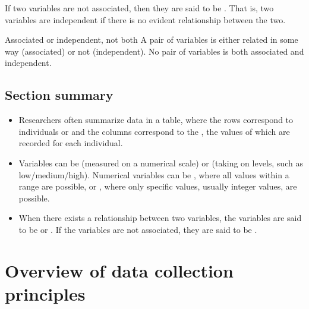 If two variables are not associated,
then they are said to be .
That is, two variables are independent if there
is no evident relationship between the two.

\begin{onebox}{Associated or independent, not both}
A pair of variables is either related in some way (associated) or not (independent). No pair of variables is both associated and independent.
\end{onebox}






\D{\newpage}

\subsection*{Section summary}
\begin{itemize}
\item Researchers often summarize data in a table, where the rows correspond to individuals or  and the columns correspond to the , the values of which are recorded for each individual.

\item Variables can be  (measured on a numerical scale) or  (taking on levels, such as low/medium/high).  Numerical variables can be , where all values within a range are possible, or , where only specific  values, usually integer values, are possible.

\item When there exists a relationship between two variables, the variables are said to be  or .  If the variables are not associated, they are said to be .

\end{itemize}



{}

\section[Overview of data collection principles]{Overview of data collection principles }
\label{overviewOfDataCollectionPrinciples}


